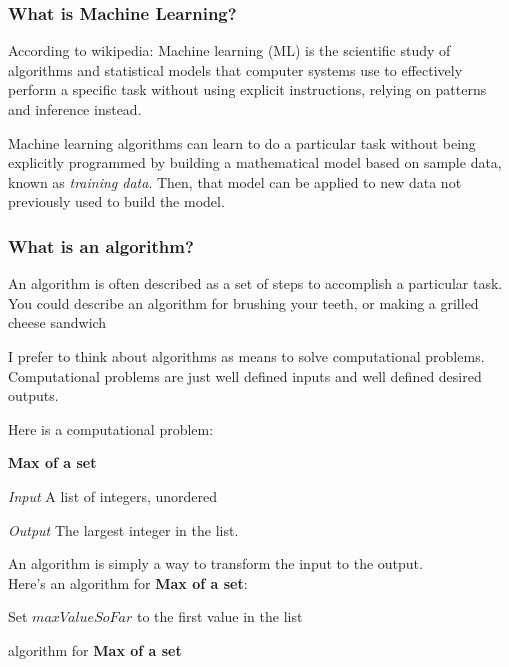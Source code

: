 \documentclass[12pt]{article}
\begin{document}
\subsubsection{What is Machine Learning?}

According to wikipedia:
Machine learning (ML) is the scientific study of algorithms and statistical models that computer systems use to effectively perform a specific task without using explicit instructions, relying on patterns and inference instead.

Machine learning algorithms can learn to do a particular task without being explicitly programmed by building a mathematical model based on sample data, known as \textit{training data}. Then, that model can be applied to new data not previously used to build the model.

\subsubsection{What is an algorithm?}

An algorithm is often described as a set of steps to accomplish a particular task. You could describe an algorithm for brushing your teeth, or making a grilled cheese sandwich 

I prefer to think about algorithms as means to solve computational problems. Computational problems are just well defined inputs and well defined desired outputs. 

Here is a computational problem:

\textbf{Max of a set}

\textit{Input} A list of integers, unordered

\textit{Output} The largest integer in the list. 

An algorithm is simply a way to transform the input to the output. \\


Here's an algorithm for \textbf{Max of a set}:\\

\begin{algorithm}[H]
    \SetAlgoLined
    Set $maxValueSoFar$ to the first value in the list \\
    
    \caption{algorithm for \textbf{Max of a set}}
\end{algorithm}
\end{document}
